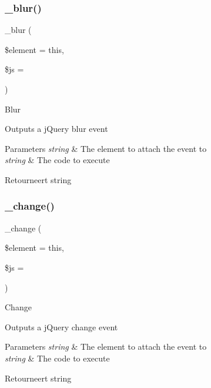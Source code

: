 \subsubsection{\texorpdfstring{\_blur()}{\_blur()}}
{\footnotesize\ttfamily \+\_\+blur (\begin{DoxyParamCaption}\item[{}]{\$element = {\ttfamily \textquotesingle{}this\textquotesingle{}},  }\item[{}]{\$js = {\ttfamily \textquotesingle{}\textquotesingle{}} }\end{DoxyParamCaption})\hspace{0.3cm}{\ttfamily [protected]}}

Blur

Outputs a j\+Query blur event


\begin{DoxyParams}{Parameters}
{\em string} & The element to attach the event to \\
\hline
{\em string} & The code to execute \\
\hline
\end{DoxyParams}
\begin{DoxyReturn}{Retourneert}
string 
\end{DoxyReturn}
\mbox{\label{class_c_i___jquery_abcb287d50d267968e11a1cb63637bfbb}} 
\subsubsection{\texorpdfstring{\_change()}{\_change()}}
{\footnotesize\ttfamily \+\_\+change (\begin{DoxyParamCaption}\item[{}]{\$element = {\ttfamily \textquotesingle{}this\textquotesingle{}},  }\item[{}]{\$js = {\ttfamily \textquotesingle{}\textquotesingle{}} }\end{DoxyParamCaption})\hspace{0.3cm}{\ttfamily [protected]}}

Change

Outputs a j\+Query change event


\begin{DoxyParams}{Parameters}
{\em string} & The element to attach the event to \\
\hline
{\em string} & The code to execute \\
\hline
\end{DoxyParams}
\begin{DoxyReturn}{Retourneert}
string 
\end{DoxyReturn}
\mbox{\label{class_c_i___jquery_a8508147ee3b37f58e7c58f365c6c1409}} 
